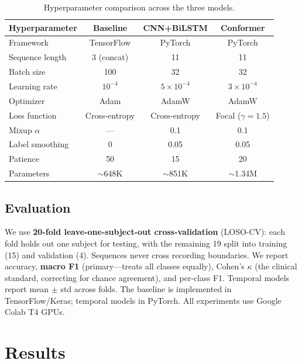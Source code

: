 \documentclass[final]{article}
\begin{document}
\begin{table}[t]
\caption{Hyperparameter comparison across the three models.}
\label{tab:hyperparams}
\centering
\small
\begin{tabular}{lccc}
\toprule
\textbf{Hyperparameter} & \textbf{Baseline} & \textbf{CNN+BiLSTM} & \textbf{Conformer} \\
\midrule
Framework        & TensorFlow   & PyTorch     & PyTorch \\
Sequence length  & 3 (concat)   & 11          & 11 \\
Batch size       & 100          & 32          & 32 \\
Learning rate    & $10^{-4}$    & $5 \times 10^{-4}$ & $3 \times 10^{-4}$ \\
Optimizer        & Adam         & AdamW       & AdamW \\
Loss function    & Cross-entropy & Cross-entropy & Focal ($\gamma\!=\!1.5$) \\
Mixup $\alpha$   & ---          & 0.1         & 0.1 \\
Label smoothing  & 0            & 0.05        & 0.05 \\
Patience         & 50           & 15          & 20 \\
Parameters       & $\sim$648K   & $\sim$851K  & $\sim$1.34M \\
\bottomrule
\end{tabular}
\end{table}

\subsection{Evaluation}

We use \textbf{20-fold leave-one-subject-out cross-validation} (LOSO-CV): each fold holds out one subject for testing, with the remaining 19 split into training (15) and validation (4). Sequences never cross recording boundaries. We report accuracy, \textbf{macro F1} (primary---treats all classes equally), Cohen's $\kappa$ (the clinical standard, correcting for chance agreement), and per-class F1. Temporal models report mean $\pm$ std across folds. The baseline is implemented in TensorFlow/Keras; temporal models in PyTorch. All experiments use Google Colab T4 GPUs.

\section{Results}
\end{document}
